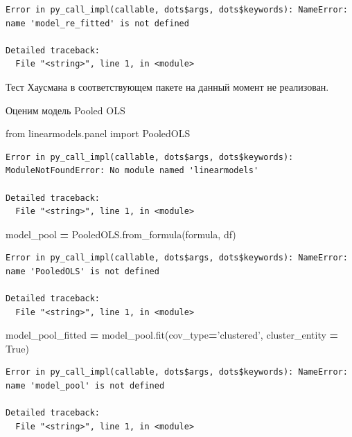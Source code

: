 \documentclass[]{book}
\newenvironment{Shaded}{\begin{snugshade}}{\end{snugshade}}
\newcommand{\ImportTok}[1]{#1}
\newcommand{\NormalTok}[1]{#1}
\newcommand{\OperatorTok}[1]{\textcolor[rgb]{0.81,0.36,0.00}{\textbf{#1}}}
\newcommand{\StringTok}[1]{\textcolor[rgb]{0.31,0.60,0.02}{#1}}
\newcommand{\VariableTok}[1]{\textcolor[rgb]{0.00,0.00,0.00}{#1}}
\begin{document}
\begin{verbatim}
Error in py_call_impl(callable, dots$args, dots$keywords): NameError: name 'model_re_fitted' is not defined

Detailed traceback: 
  File "<string>", line 1, in <module>
\end{verbatim}

Тест Хаусмана в соответствующем пакете на данный момент не реализован.

Оценим модель Pooled OLS

\begin{Shaded}
\begin{Highlighting}[]
\ImportTok{from}\NormalTok{ linearmodels.panel }\ImportTok{import}\NormalTok{ PooledOLS}
\end{Highlighting}
\end{Shaded}

\begin{verbatim}
Error in py_call_impl(callable, dots$args, dots$keywords): ModuleNotFoundError: No module named 'linearmodels'

Detailed traceback: 
  File "<string>", line 1, in <module>
\end{verbatim}

\begin{Shaded}
\begin{Highlighting}[]
\NormalTok{model_pool }\OperatorTok{=}\NormalTok{ PooledOLS.from_formula(formula, df)}
\end{Highlighting}
\end{Shaded}

\begin{verbatim}
Error in py_call_impl(callable, dots$args, dots$keywords): NameError: name 'PooledOLS' is not defined

Detailed traceback: 
  File "<string>", line 1, in <module>
\end{verbatim}

\begin{Shaded}
\begin{Highlighting}[]
\NormalTok{model_pool_fitted }\OperatorTok{=}\NormalTok{ model_pool.fit(cov_type}\OperatorTok{=}\StringTok{'clustered'}\NormalTok{, cluster_entity }\OperatorTok{=} \VariableTok{True}\NormalTok{)}
\end{Highlighting}
\end{Shaded}

\begin{verbatim}
Error in py_call_impl(callable, dots$args, dots$keywords): NameError: name 'model_pool' is not defined

Detailed traceback: 
  File "<string>", line 1, in <module>
\end{verbatim}
\end{document}
